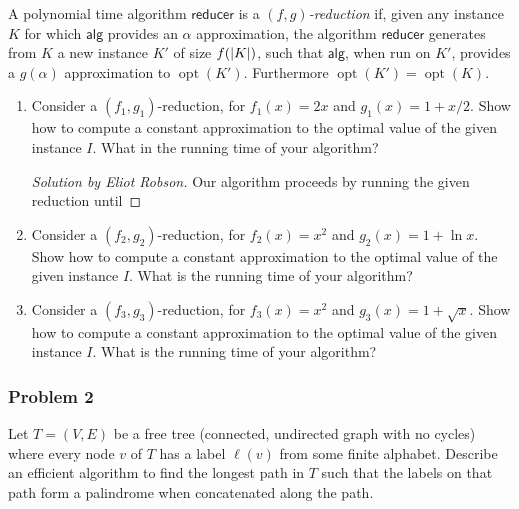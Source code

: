 \documentclass{article}
\newenvironment{solution}[1]{\begin{proof}[Solution by #1]}{\end{proof}}
\DeclareMathOperator{\opt}{opt}
\begin{document}
A polynomial time algorithm \(\mathsf{reducer}\) is a \emph{\((f,g)\)-reduction} if, given any instance \(K\) for which \(\mathsf{alg}\) provides an \(\alpha\) approximation, the algorithm \(\mathsf{reducer}\) generates from \(K\) a new instance \(K'\) of size \(f(\abs[0]{K})\), such that \(\mathsf{alg}\), when run on \(K'\), provides a \(g(\alpha)\) approximation to \(\opt(K')\). Furthermore \(\opt(K') = \opt(K)\).

\begin{enumerate}
    \item Consider a \((f_1, g_1)\)-reduction, for \(f_1 (x) = 2x\) and \(g_1 (x) = 1 + x/2\). Show how to compute a constant approximation to the optimal value of the given instance \(I\). What in the running time of your algorithm?
    
    \begin{solution}{Eliot Robson}
        Our algorithm proceeds by running the given reduction until 
    \end{solution}
    
    \item Consider a \((f_2, g_2)\)-reduction, for \(f_2 (x) = x^2\) and \(g_2 (x) = 1 + \ln x\). Show how to compute a constant approximation to the optimal value of the given instance \(I\). What is the running time of your algorithm?
    
    \item Consider a \((f_3, g_3)\)-reduction, for \(f_3 (x) = x^2\) and \(g_3 (x) = 1 + \sqrt{x}\). Show how to compute a constant approximation to the optimal value of the given instance \(I\). What is the running time of your algorithm?
\end{enumerate}

\subsubsection{Problem 2}
Let \(T = (V,E)\) be a free tree (connected, undirected graph with no cycles) where every node \(v\) of \(T\) has a label \(\ell(v)\) from some finite alphabet. Describe an efficient algorithm to find the longest path in \(T\) such that the labels on that path form a palindrome when concatenated along the path.
\end{document}
